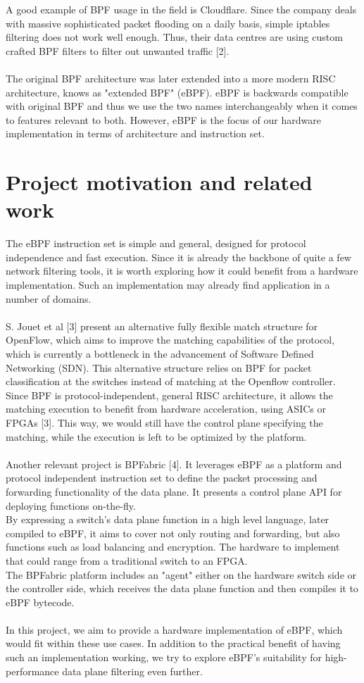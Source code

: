 \documentclass{l4proj}
\begin{document}
A good example of BPF usage in the field is Cloudflare. Since the company deals with massive sophisticated packet flooding on a daily basis, simple iptables filtering does not work well enough. Thus, their data centres are using custom crafted BPF filters to filter out unwanted traffic [2].\\\\
The original BPF architecture was later extended into a more modern RISC architecture, knows as "extended BPF" (eBPF). eBPF is backwards compatible with original BPF and thus we use the two names interchangeably when it comes to features relevant to both. However, eBPF is the focus of our hardware implementation in terms of architecture and instruction set.

\section{Project motivation and related work}
The eBPF instruction set is simple and general, designed for protocol independence and fast execution. Since it is already the backbone of quite a few network filtering tools, it is worth exploring how it could benefit from a hardware implementation. Such an implementation may already find application in a number of domains.\\\\
S. Jouet et al [3] present an alternative fully flexible match structure for OpenFlow, which aims to improve the matching capabilities of the protocol, which is currently a bottleneck in the advancement of Software Defined Networking (SDN). This alternative structure relies on BPF for packet classification at the switches instead of matching at the Openflow controller. Since BPF is protocol-independent, general RISC architecture, it allows the matching execution to benefit from hardware acceleration, using ASICs or FPGAs [3]. This way, we would still have the control plane specifying the matching, while the execution is left to be optimized by the platform.\\\\
Another relevant project is BPFabric [4]. It leverages eBPF as a platform and protocol independent instruction set to define the packet processing and forwarding functionality of the data plane. It presents a control plane API for deploying functions on-the-fly.\\
By expressing a switch's data plane function in a high level language, later compiled to eBPF, it aims to cover not only routing and forwarding, but also functions such as load balancing and encryption. The hardware to implement that could range from a traditional switch to an FPGA.\\
The BPFabric platform includes an "agent" either on the hardware switch side or the controller side, which receives the data plane function and then compiles it to eBPF bytecode.\\\\
In this project, we aim to provide a hardware implementation of eBPF, which would fit within these use cases. In addition to the practical benefit of having such an implementation working, we try to explore eBPF's suitability for high-performance data plane filtering even further.
\end{document}
